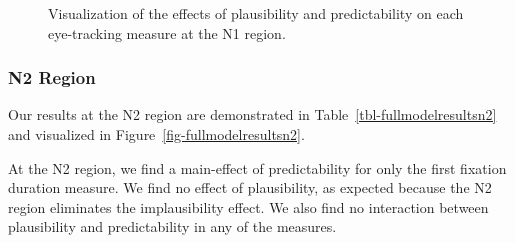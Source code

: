 \documentclass[
  12pt,
  letterpaper,
]{scrreport}
\begin{document}
\begin{figure}[htbp]

\caption{\label{fig-fullmodelresultsn1}Visualization of the effects of
plausibility and predictability on each eye-tracking measure at the N1
region.}


\end{figure}%

\subsubsection{N2 Region}\label{n2-region-1}

Our results at the N2 region are demonstrated in
Table~\ref{tbl-fullmodelresultsn2} and visualized in
Figure~\ref{fig-fullmodelresultsn2}.

At the N2 region, we find a main-effect of predictability for only the
first fixation duration measure. We find no effect of plausibility, as
expected because the N2 region eliminates the implausibility effect. We
also find no interaction between plausibility and predictability in any
of the measures.
\end{document}
